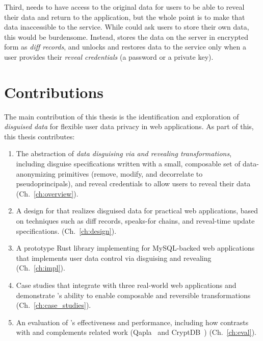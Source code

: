 %
Third, \sys needs to have access to the original data for users to be able to
reveal their data and return to the application, but the whole point is to make
that data inaccessible to the service.
%
While \sys could ask users to store their own \xxed data, this would be
burdensome.
%
Instead, \sys stores the \xxed data on the server in encrypted form as
\emph{diff records}, and unlocks
and restores data to the service only when a user provides their \emph{reveal
credentials} (\eg a password or a private key).

%
\section{Contributions}
%
The main contribution of this thesis is the identification and exploration of
\emph{disguised data} for flexible user data privacy in web applications. As
part of this, this thesis contributes:

\begin{enumerate}[nosep]
    \item The abstraction of \emph{data disguising via \xxing and revealing
        transformations}, including 
        disguise specifications written with a small, composable set of
        data-anonymizing primitives (remove, modify, and decorrelate to
        pseudoprincipals), and reveal credentials to allow users
        to reveal their data (Ch.~\ref{ch:overview}).

    \item A design for \sys that realizes disguised data for practical web
        applications, based on techniques such as diff records, speaks-for
        chains, and reveal-time update specifications.
        (Ch.~\ref{ch:design}).

    \item A prototype Rust library implementing \sys for MySQL-backed web applications that
        implements user data control via disguising and revealing
        (Ch.~\ref{ch:impl}).

    \item Case studies that integrate \sys with three real-world web
    applications and demonstrate \sys's ability to enable composable and
        reversible transformations (Ch.~\ref{ch:case_studies}).

    \item An evaluation of \sys's effectiveness and performance, including how
    \sys contrasts with and complements related work (Qapla~\cite{qapla} and
        CryptDB~\cite{cryptdb}) (Ch.~\ref{ch:eval}).
\end{enumerate}
%

